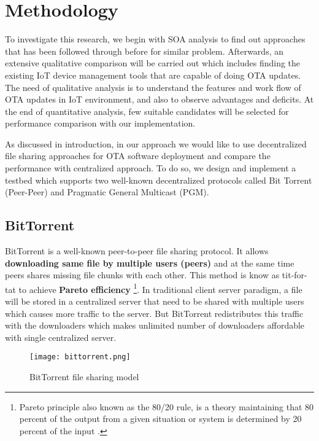 \documentclass[12pt]{article}
\begin{document}
\section{Methodology}
To investigate this research, we begin with SOA analysis to find out approaches that has been followed through before for similar problem. Afterwards, an extensive qualitative comparison will be carried out which includes finding the existing IoT device management tools that are capable of doing OTA updates. The need of qualitative analysis is to understand the features and work flow of OTA updates in IoT environment,  and also to observe advantages and deficits. At the end of quantitative analysis, few suitable candidates will be selected for performance comparison with our implementation. 

As discussed in introduction, in our approach we would like to use decentralized file sharing approaches for OTA software deployment and compare the performance with centralized approach. To do so, we design and implement a testbed which supports two well-known decentralized protocols called Bit Torrent (Peer-Peer) and Pragmatic General Multicast (PGM). 

\subsection{BitTorrent}

BitTorrent is a well-known peer-to-peer file sharing protocol. It allows \textbf{downloading same file by multiple users (peers)} and at the same time peers shares missing file chunks with each other. This method is know as tit-for-tat to achieve \textbf{Pareto efficiency} \footnote{Pareto principle also known as the 80/20 rule, is a theory maintaining that 80 percent of the output from a given situation or system is determined by 20 percent of the input \cite{misc02}.}. In traditional client server paradigm, a file will be stored in a centralized server that need to be shared with multiple users which causes more traffic to the server. But BitTorrent redistributes this traffic with the downloaders which makes unlimited number of downloaders affordable \cite{cohen2003incentives} with single centralized server.

\begin{figure}[h!]
	\texttt{[image: bittorrent.png]}
	\caption{ BitTorrent file sharing model\cite{bittorrent_arch}}
	\label{fig:bittorrent}
\end{figure}
\end{document}

